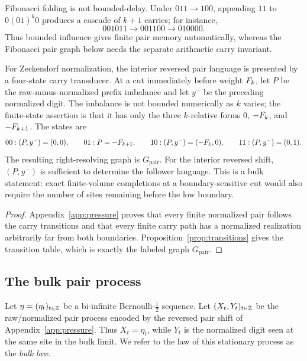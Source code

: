 \begin{remark}\label{rem:fibonacci-unbounded-delay}
Fibonacci folding is not bounded-delay. Under \(011\to100\), appending \(11\) to \(0(01)^k0\) produces a cascade of \(k+1\) carries; for instance,
\[
001011\longrightarrow001100\longrightarrow010000.
\]
Thus bounded influence gives finite pair memory automatically, whereas the Fibonacci pair graph below needs the separate arithmetic carry invariant.
\end{remark}

\begin{corollary}\label{cor:fib-pair-criterion}
For Zeckendorf normalization, the interior reversed pair language is presented by a four-state carry transducer. At a cut immediately before weight \(F_k\), let \(P\) be the raw-minus-normalized prefix imbalance and let \(y^-\) be the preceding normalized digit. The imbalance is not bounded numerically as \(k\) varies; the finite-state assertion is that it has only the three \(k\)-relative forms \(0\), \(-F_k\), and \(-F_{k+1}\). The states are
\[
00:(P,y^-)=(0,0),\qquad
01:P=-F_{k+1},\qquad
10:(P,y^-)=(-F_k,0),\qquad
11:(P,y^-)=(0,1).
\]
The resulting right-resolving graph is \(G_{\mathrm{pair}}\).
For the interior reversed shift, \((P,y^-)\) is sufficient to determine the follower language. This is a bulk statement: exact finite-volume completions at a boundary-sensitive cut would also require the number of sites remaining before the low boundary.
\end{corollary}

\begin{proof}
Appendix~\ref{app:pressure} proves that every finite normalized pair follows the carry transitions and that every finite carry path has a normalized realization arbitrarily far from both boundaries. Proposition~\ref{prop:transitions} gives the transition table, which is exactly the labeled graph \(G_{\mathrm{pair}}\).
\end{proof}

\subsection{The bulk pair process}
\label{subsec:joint-law}

Let \(\eta=(\eta_t)_{t\in\mathbb{Z}}\) be a bi-infinite Bernoulli-\(\frac12\) sequence. Let \((X_t,Y_t)_{t\in\mathbb{Z}}\) be the raw/normalized pair process encoded by the reversed pair shift of Appendix~\ref{app:pressure}. Thus \(X_t=\eta_t\), while \(Y_t\) is the normalized digit seen at the same site in the bulk limit. We refer to the law of this stationary process as the \emph{bulk law}.

